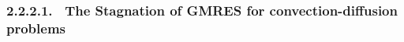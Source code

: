 \subsubsection{2.2.2.1. \ The Stagnation of GMRES for convection-diffusion problems}
\label{back:itersolvers:krylov:stagnation}

%
%

